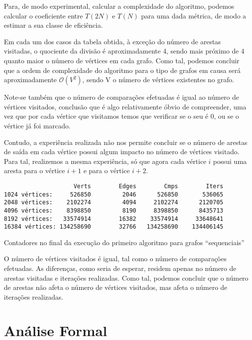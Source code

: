 Para, de modo experimental, calcular a complexidade do algoritmo,
podemos calcular o coeficiente entre $T(2N)$ e $T(N)$ para uma dada métrica,
de modo a estimar a sua classe de eficiência.

Em cada um dos casos da tabela obtida, à exceção do número de arestas
visitadas, o quociente da divisão é aproximadamente 4,
sendo mais próximo de 4 quanto maior o número de vértices em cada
grafo. Como tal, podemos concluir que
a ordem de complexidade do algoritmo para o tipo de grafos em
causa será aproximadamente $\mathcal{O}\left( V^2 \right)$, sendo V o número de
vértices existentes no grafo.

Note-se também que o número de comparações efetuadas é igual ao
número de vértices visitados, conclusão que é algo relativamente
óbvio de compreender, uma vez que por cada vértice que visitamos
temos que verificar se o seu  é 0, ou se o vértice
já foi marcado.

Contudo, a experiência realizada não nos permite concluir se o
número de arestas de saída em cada vértice possui algum impacto
no número de vértices visitado. Para tal, realizemos a mesma
experiência, só que agora cada vértice $i$ possui uma aresta para
o vértice $i + 1$ e para o vértice $i + 2$.

\begin{listing}[H]
	\centering
	\begin{verbatim}
                    Verts	     Edges	      Cmps        Iters
1024 vértices:     526850	      2046	    526850       536065
2048 vértices:    2102274	      4094	   2102274      2120705
4096 vértices:    8398850	      8190	   8398850      8435713
8192 vértices:   33574914	     16382	  33574914     33648641
16384 vértices: 134258690	     32766	 134258690    134406145
	\end{verbatim}
	\caption{Contadores no final da execução do primeiro algoritmo
		para grafos \enquote{sequenciais}}
	\label{1-3}
\end{listing}

O número de vértices visitados é igual, tal como o número de
comparações efetuadas. As diferenças, como seria de esperar, residem
apenas no número de arestas visitadas e iterações realizadas.
Como tal, podemos concluir que o número de arestas não afeta o número de
vértices visitados, mas afeta o número de iterações realizadas.

\section{Análise Formal}

